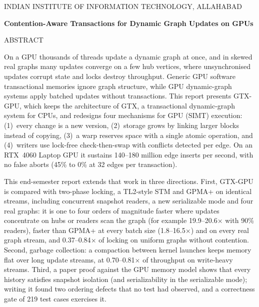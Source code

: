 \documentclass[11pt,a4paper,oneside]{report}
\newcommand{\ttitle}{Contention-Aware Transactions for Dynamic Graph Updates on GPUs}
\newcommand{\sys}{GTX-GPU}
\begin{document}
\pagestyle{front}
\thispagestyle{front}
\begin{center}
{\normalsize INDIAN INSTITUTE OF INFORMATION TECHNOLOGY, ALLAHABAD\par}
\vspace{0.3cm}
{\large\bfseries \ttitle\par}
\vspace{0.3cm}
{\large ABSTRACT\par}
\end{center}
On a GPU thousands of threads update a dynamic graph at once, and in skewed real graphs many updates converge on a few
hub vertices, where unsynchronised updates corrupt state and locks destroy throughput. Generic GPU software
transactional memories ignore graph structure, while GPU dynamic-graph systems apply batched updates without
transactions. This report presents \sys{}, which keeps the architecture of GTX, a transactional dynamic-graph system for
CPUs, and redesigns four mechanisms for GPU (SIMT) execution: (1)~every change is a new version, (2)~storage grows by
linking larger blocks instead of copying, (3)~a warp reserves space with a single atomic operation, and (4)~writers use
lock-free check-then-swap with conflicts detected per edge. On an RTX~4060 Laptop GPU it sustains 140--180 million
edge inserts per second, with no false aborts (45\% to 0\% at 32 edges per transaction).

This end-semester report extends that work in three directions. First, \sys{} is compared with two-phase locking,
a TL2-style STM and GPMA+ on identical streams, including concurrent snapshot readers, a new serializable mode and four
real graphs: it is one to four orders of magnitude faster where updates concentrate on hubs or readers scan the graph
(for example 19.9--20.6$\times$ with 90\% readers), faster than GPMA+ at every batch size (1.8--16.5$\times$) and
on every real graph stream, and 0.37--0.84$\times$ of locking on uniform graphs without contention. Second, garbage
collection: a compaction between kernel launches keeps memory flat over long update streams, at 0.70--0.81$\times$ of
throughput on write-heavy streams. Third, a paper proof against the GPU memory model shows that every history satisfies snapshot
isolation (and serializability in the serializable mode); writing it found two ordering defects that no test had
observed, and a correctness gate of 219 test cases exercises it.
\end{document}
